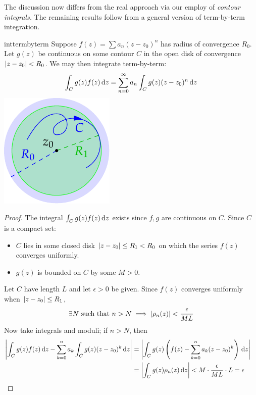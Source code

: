 The discussion now differs from the real approach via our employ of \emph{contour integrals.} The remaining results follow from a general version of term-by-term integration.

\begin{thm}[lower separated=false, sidebyside, sidebyside align=top seam, sidebyside gap=0pt, righthand width=0.25\linewidth]{}{inttermbyterm}
	Suppose $f(z)=\sum a_n(z-z_0)^n$ has radius of convergence $R_0$. Let $g(z)$ be continuous on some contour $C$ in the open disk of convergence $\left| z-z_0\right|<R_0$. We may then integrate term-by-term:
	\[
		\int_Cg(z)f(z)\,{\mathrm{d} z}=\sum_{n=0}^\infty a_n\int_C g(z)(z-z_0)^n\,{\mathrm{d} z}
	\]
	\tcblower
	\flushright\includegraphics[scale=0.95]{cont2}
\end{thm}

\begin{proof}
	The integral $\int_C g(z)f(z)\,{\mathrm{d} z}$ exists since $f,g$ are continuous on $C$. Since $C$ is a compact set:
	\begin{itemize}
	  \item $C$ lies in some closed disk $\left| z-z_0\right|\le R_1<R_0$ on which the series $f(z)$ converges uniformly.
	  \item $g(z)$ is bounded on $C$ by some $M>0$.
	\end{itemize}
	Let $C$ have length $L$ and let $\epsilon>0$ be given. Since $f(z)$ converges uniformly when $\left| z-z_0\right|\le R_1$,
	\[
		\exists N\text{ such that }n>N\implies \left| \rho_n(z)\right|<\frac\epsilon{ML}
	\]
	Now take integrals and moduli; if $n>N$, then
	\begin{align*}
		\left| \int_Cg(z)f(z)\,{\mathrm{d} z}-\sum_{k=0}^n a_k\int_C g(z)(z-z_0)^k\,{\mathrm{d} z}\right|
		&=\left| \int_C g(z)\left(f(z)-\sum_{k=0}^n a_k(z-z_0)^k\right)\,{\mathrm{d} z}\right|\\
		&=\left| \int_C g(z)\rho_n(z)\,{\mathrm{d} z}\right|
		< M\cdot\frac{\epsilon}{ML}\cdot L=\epsilon \tag*{\qedhere}
	\end{align*}
\end{proof}


